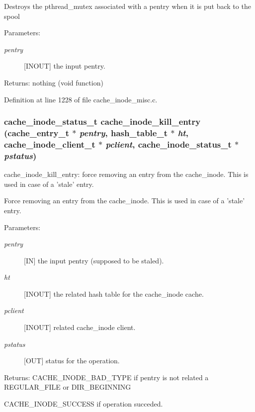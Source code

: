 Destroys the pthread\_\-mutex associated with a pentry when it is put back to the spool

\begin{Desc}
\item[Parameters:]
\begin{description}
\item[{\em pentry}][INOUT] the input pentry.\end{description}
\end{Desc}
\begin{Desc}
\item[Returns:]nothing (void function) \end{Desc}


Definition at line 1228 of file cache\_\-inode\_\-misc.c.
\subsubsection{\setlength{\rightskip}{0pt plus 5cm}cache\_\-inode\_\-status\_\-t cache\_\-inode\_\-kill\_\-entry (cache\_\-entry\_\-t $\ast$ {\em pentry}, hash\_\-table\_\-t $\ast$ {\em ht}, cache\_\-inode\_\-client\_\-t $\ast$ {\em pclient}, cache\_\-inode\_\-status\_\-t $\ast$ {\em pstatus})}\label{cache__inode__misc_8c_a19}


cache\_\-inode\_\-kill\_\-entry: force removing an entry from the cache\_\-inode. This is used in case of a 'stale' entry.

Force removing an entry from the cache\_\-inode. This is used in case of a 'stale' entry.

\begin{Desc}
\item[Parameters:]
\begin{description}
\item[{\em pentry}][IN] the input pentry (supposed to be staled). \item[{\em ht}][INOUT] the related hash table for the cache\_\-inode cache. \item[{\em pclient}][INOUT] related cache\_\-inode client. \item[{\em pstatus}][OUT] status for the operation.\end{description}
\end{Desc}
\begin{Desc}
\item[Returns:]CACHE\_\-INODE\_\-BAD\_\-TYPE if pentry is not related a REGULAR\_\-FILE or DIR\_\-BEGINNING \par
 

CACHE\_\-INODE\_\-SUCCESS if operation succeded. \end{Desc}


